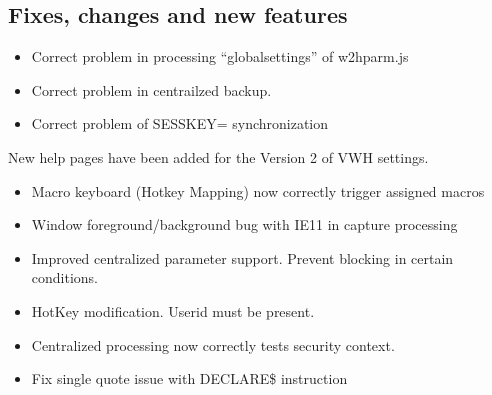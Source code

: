 \documentclass[letterpaper,10pt,english]{sphinxmanual}
\begin{document}
\subsection{Fixes, changes and new features}
\label{\detokenize{Getting_Started:fixes-changes-and-new-features}}
\begin{itemize}
\item {} 
Correct problem in processing “global\sphinxhyphen{}settings” of w2hparm.js

\item {} 
Correct problem in centrailzed backup.

\item {} 
Correct problem of SESSKEY= synchronization

\end{itemize}

New help pages have been added for the Version 2 of VWH settings.

\begin{itemize}
\item {} 
Macro keyboard (Hotkey Mapping) now correctly trigger assigned macros

\end{itemize}

\begin{itemize}
\item {} 
Window foreground/background bug with IE11 in capture processing

\end{itemize}

\begin{itemize}
\item {} 
Improved centralized parameter support. Prevent blocking in certain conditions.

\item {} 
HotKey modification. Userid must be present.

\item {} 
Centralized processing now correctly tests security context.

\end{itemize}

\begin{itemize}
\item {} 
Fix single quote issue with DECLARE\$ instruction

\end{itemize}
\end{document}
